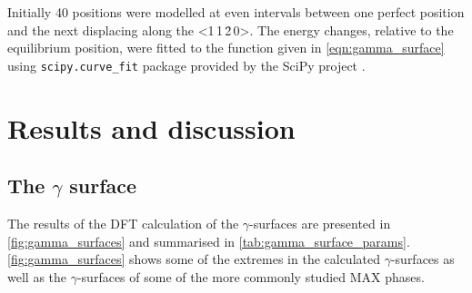 Initially 40 positions were modelled at even intervals between one perfect position and the next displacing along the <1\,1\,\={2}\,0>. The energy changes, relative to the equilibrium position, were fitted to the function given in \autoref{eqn:gamma_surface} using \texttt{scipy.curve\_fit} package provided by the SciPy project \cite{SciPy2001}.





\section{Results and discussion}

\subsection{The \texorpdfstring{$\gamma$}{gamma} surface}
The results of the DFT calculation of the $\gamma$-surfaces are presented in \autoref{fig:gamma_surfaces} and summarised in \autoref{tab:gamma_surface_params}. \autoref{fig:gamma_surfaces} shows some of the extremes in the calculated $\gamma$-surfaces as well as the $\gamma$-surfaces of some of the more commonly studied MAX phases. 


